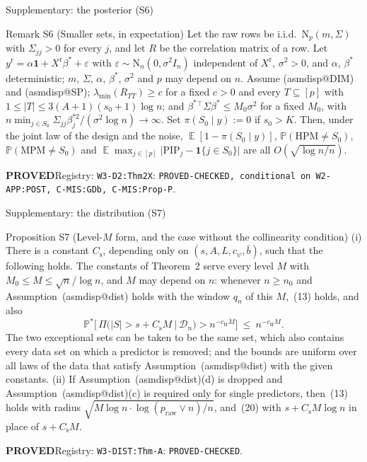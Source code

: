 \documentclass[aspectratio=169]{beamer}
\makeatletter
\newcommand{\asmdisp}[1]{\csname asmdisp@#1\endcsname}
\newcommand{\as}[1]{\textup{(\asmdisp{#1})}}
\newcommand{\one}{\mathbf{1}}
\newcommand{\ind}[1]{\mathbf{1}\{#1\}}
\newcommand{\set}[1]{[#1]}
\newcommand{\abs}[1]{\lvert #1\rvert}
\DeclareMathOperator{\E}{\mathbb{E}}
\renewcommand{\P}{\mathbb{P}}
\newcommand{\Normal}{\mathrm{N}}
\newcommand{\lmin}{\lambda_{\min}}
\newcommand{\yr}{y^{\mathrm r}}
\newcommand{\Xr}{X^{\mathrm r}}
\newcommand{\praw}{p_{\mathrm{raw}}}
\newcommand{\bstar}{\beta^*}
\newcommand{\Sz}{S_0}
\newcommand{\sz}{s_0}
\newcommand{\rn}{\sqrt{\log n/n}}
\newcommand{\Dn}{\mathcal D_n}
\newcommand{\pis}[1]{\pi(#1\mid y)}
\newcommand{\PIP}{\mathrm{PIP}}
\newcommand{\HPM}{\mathrm{HPM}}
\newcommand{\MPM}{\mathrm{MPM}}
\newcommand{\rid}[1]{\texttt{#1}}
\makeatother
\begin{document}
\begin{frame}{Supplementary: the posterior (S6)}
\footnotesize
\begin{block}{Remark S6 (Smaller sets, in expectation)}
Let the raw rows be i.i.d.\ $\Normal_p(m,\Sigma)$ with $\Sigma_{jj}>0$ for every $j$, and let $R$ be the correlation
matrix of a row. Let $\yr=\alpha\one+\Xr\bstar+\varepsilon$ with $\varepsilon\sim\Normal_n(0,\sigma^2I_n)$ independent of
$\Xr$, $\sigma^2>0$, and $\alpha$, $\bstar$ deterministic; $m$, $\Sigma$, $\alpha$, $\bstar$, $\sigma^2$ and $p$ may depend on
$n$. Assume \as{DIM} and \as{SP}; $\lmin(R_{TT})\ge c$ for a fixed $c>0$ and every $T\subseteq\set p$ with
$1\le\abs{T}\le3(A+1)(\sz+1)\log n$; and $\bstar{}^\top\Sigma\bstar\le M_0\sigma^2$ for a fixed $M_0$, with
$n\min_{j\in\Sz}\Sigma_{jj}\beta^{*2}_j/(\sigma^2\log n)\to\infty$. Set $\pis{\Sz}:=0$ if $\sz>K$. Then, under the joint law
of the design and the noise, $\E[1-\pis{\Sz}]$, $\P(\HPM\neq\Sz)$, $\P(\MPM\neq\Sz)$ and
$\E\max_{j\in\set p}\abs{\PIP_j-\ind{j\in\Sz}}$ are all $O(\rn)$.
\end{block}
{\footnotesize \textbf{PROVED}\quad Registry: \rid{W3-D2:Thm2X}: \rid{PROVED-CHECKED, conditional on W2-APP:POST, C-MIS:GDb, C-MIS:Prop-P}.}

\end{frame}

\begin{frame}{Supplementary: the distribution (S7)}
\footnotesize
\begin{block}{Proposition S7 (Level-$M$ form, and the case without the collinearity condition)}
\textup{(i)} There is a constant $C_{\mathrm s}$, depending only on $(s,A,L,c_\psi,\bar b)$, such that the following holds. The
constants of Theorem~2 serve every level $M$ with $M_0\le M\le\sqrt n/\log n$, and $M$ may depend on $n$:
whenever $n\ge n_0$ and Assumption~\as{dist} holds with the window $q_n$ of this $M$,~\textup{(13)} holds, and also
\begin{equation}\tag{20}
  \P^*\Big[\,\Pi\big(\abs{S}>s+C_{\mathrm s}M\ \big|\ \Dn\big)>n^{-c_{\mathrm H} M}\Big]\ \le\ n^{-c_{\mathrm H} M}.
\end{equation}
The two exceptional sets can be taken to be the same set, which also contains every data set on which a predictor is
removed; and the bounds are uniform over all laws of the data that satisfy
Assumption~\as{dist} with the given constants.
\textup{(ii)} If Assumption~\as{dist}(d) is dropped and Assumption~\as{dist}(c) is
required only for single predictors, then~\textup{(13)} holds with radius $\sqrt{M\log n\cdot\log(\praw\vee n)/n}$,
and~\textup{(20)} with $s+C_{\mathrm s}M\log n$ in place of $s+C_{\mathrm s}M$.
\end{block}
{\footnotesize \textbf{PROVED}\quad Registry: \rid{W3-DIST:Thm-A}: \rid{PROVED-CHECKED}.}

\end{frame}
\end{document}
